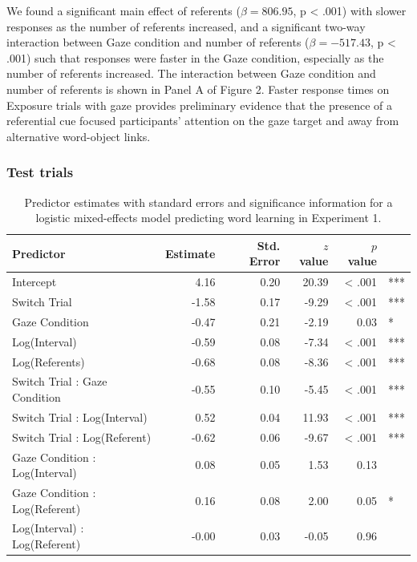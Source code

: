 \documentclass[a4paper,man,natbib]{apa6}
\begin{document}
\noindent We found a significant main effect of referents
(\(\beta = 806.95\), p \textless{} .001) with slower responses as the
number of referents increased, and a significant two-way interaction
between Gaze condition and number of referents (\(\beta = -517.43\), p
\textless{} .001) such that responses were faster in the Gaze condition,
especially as the number of referents increased. The interaction between
Gaze condition and number of referents is shown in Panel A of Figure 2.
Faster response times on Exposure trials with gaze provides preliminary
evidence that the presence of a referential cue focused participants'
attention on the gaze target and away from alternative word-object
links.

\subsubsection{Test trials}\label{test-trials}

\begin{table}[ht]
\centering
\caption{Predictor estimates with standard errors and significance information for a logistic mixed-effects model predicting word learning in Experiment 1.} 
\label{tab:exp1_reg}
\begin{tabular}{lrrrrl}
 Predictor & Estimate & Std. Error & $z$ value & $p$ value &  \\ 
  \hline
Intercept & 4.16 & 0.20 & 20.39 & < .001 & *** \\ 
  Switch Trial & -1.58 & 0.17 & -9.29 & < .001 & *** \\ 
  Gaze Condition & -0.47 & 0.21 & -2.19 & 0.03 & * \\ 
  Log(Interval) & -0.59 & 0.08 & -7.34 & < .001 & *** \\ 
  Log(Referents) & -0.68 & 0.08 & -8.36 & < .001 & *** \\ 
  Switch Trial : Gaze Condition & -0.55 & 0.10 & -5.45 & < .001 & *** \\ 
  Switch Trial : Log(Interval) & 0.52 & 0.04 & 11.93 & < .001 & *** \\ 
  Switch Trial : Log(Referent) & -0.62 & 0.06 & -9.67 & < .001 & *** \\ 
  Gaze Condition : Log(Interval) & 0.08 & 0.05 & 1.53 & 0.13 &  \\ 
  Gaze Condition : Log(Referent) & 0.16 & 0.08 & 2.00 & 0.05 & * \\ 
  Log(Interval) : Log(Referent) & -0.00 & 0.03 & -0.05 & 0.96 &  \\ 
   \hline
\end{tabular}
\end{table}
\end{document}
